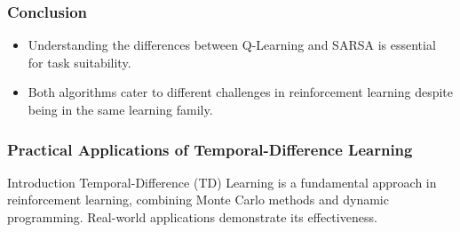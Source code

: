 \documentclass[aspectratio=169]{beamer}
\begin{document}
\begin{frame}[fragile]
    \frametitle{Conclusion}
    \begin{itemize}
        \item Understanding the differences between Q-Learning and SARSA is essential for task suitability.
        \item Both algorithms cater to different challenges in reinforcement learning despite being in the same learning family.
    \end{itemize}
\end{frame}

\begin{frame}
    \frametitle{Practical Applications of Temporal-Difference Learning}
    \begin{block}{Introduction}
        Temporal-Difference (TD) Learning is a fundamental approach in reinforcement learning, combining Monte Carlo methods and dynamic programming. Real-world applications demonstrate its effectiveness.
    \end{block}
\end{frame}
\end{document}
